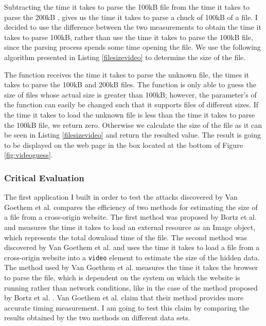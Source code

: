 \documentclass[10pt,a4paper,twoside]{book}
\begin{document}
Subtracting the time it takes to parse the 100kB file  from the time it takes to parse the 200kB , gives us the time it takes to parse a chuck of 100kB of a file. I decided to use the difference between the two measurements to obtain the time it takes to parse 100kB, rather than use the time it takes to parse the 100kB file, since the parsing process spends some time opening the file. We use the following algorithm presented in Listing \ref{filesizevideo} to determine the size of the file.

The function receives the time it takes to parse the unknown file, the times it takes to parse the 100kB and 200kB files. The function is only able to guess the size of files whose actual size is greater than 100kB; however, the parameter's of the function can easily be changed such that it supports files of different sizes. If the time it takes to load the unknown file is less than the time it takes to parse the 100kB file, we return zero. Otherwise we calculate the size of the file as it can be seen in Listing \ref{filesizevideo} and return the resulted value. The result is going to be displayed on the web page in the box located at the bottom of Figure \ref{fig:videoguess}.

\subsubsection{Critical Evaluation}

The first application I built in order to test the attacks discovered by Van Goethem et al. \cite{van2015clock} compares the efficiency of two methods for estimating the size of a file from a cross-origin website. The first method was proposed by Bortz et al. \cite{bortz2007exposing} and measures the time it takes to load an external resource as an Image object, which represents the total download time of the file. The second method was discovered by Van Goethem et al. \cite{van2015clock} and uses the time it takes to load a file from a cross-origin website into a \texttt{video} element to estimate the size of the hidden data. The method used by Van Goethem et al. \cite{van2015clock} measures the time it takes the browser to parse the file, which is dependent on the system on which the website is running rather than network conditions, like in the case of the method proposed by Bortz et al. \cite{bortz2007exposing}. Van Goethem et al. \cite{van2015clock} claim that their method provides more accurate timing measurement. I am going to test this claim by comparing the results obtained by the two methods on different data sets.
\end{document}
